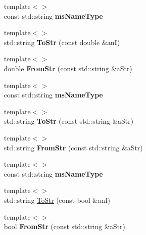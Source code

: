 \begin{DoxyCompactItemize}
\item 
{\footnotesize template$<$$>$ }\\const std\+::string {\bfseries ms\+Name\+Type}\hypertarget{classMMVII_1_1cStrIO_a4858ecf84461fb64cb3ed238611ec2ec}{}\label{classMMVII_1_1cStrIO_a4858ecf84461fb64cb3ed238611ec2ec}

\item 
{\footnotesize template$<$$>$ }\\std\+::string {\bfseries To\+Str} (const double \&anI)\hypertarget{classMMVII_1_1cStrIO_a6c24ca7c57073fe580fb1dbae47f0264}{}\label{classMMVII_1_1cStrIO_a6c24ca7c57073fe580fb1dbae47f0264}

\item 
{\footnotesize template$<$$>$ }\\double {\bfseries From\+Str} (const std\+::string \&a\+Str)\hypertarget{classMMVII_1_1cStrIO_ab50d8235935550074326ad3599f132a2}{}\label{classMMVII_1_1cStrIO_ab50d8235935550074326ad3599f132a2}

\item 
{\footnotesize template$<$$>$ }\\const std\+::string {\bfseries ms\+Name\+Type}\hypertarget{classMMVII_1_1cStrIO_afb687f6d989d13ae431bf97afbbe39e9}{}\label{classMMVII_1_1cStrIO_afb687f6d989d13ae431bf97afbbe39e9}

\item 
{\footnotesize template$<$$>$ }\\std\+::string {\bfseries To\+Str} (const std\+::string \&a\+Str)\hypertarget{classMMVII_1_1cStrIO_a90659cc9838948f7867c96bba2ea37d5}{}\label{classMMVII_1_1cStrIO_a90659cc9838948f7867c96bba2ea37d5}

\item 
{\footnotesize template$<$$>$ }\\std\+::string {\bfseries From\+Str} (const std\+::string \&a\+Str)\hypertarget{classMMVII_1_1cStrIO_a25dbf649bdc11b32cd71c9c4058f2209}{}\label{classMMVII_1_1cStrIO_a25dbf649bdc11b32cd71c9c4058f2209}

\item 
{\footnotesize template$<$$>$ }\\const std\+::string {\bfseries ms\+Name\+Type}\hypertarget{classMMVII_1_1cStrIO_ad16d7c4b4af20a33eb95daffe439566e}{}\label{classMMVII_1_1cStrIO_ad16d7c4b4af20a33eb95daffe439566e}

\item 
{\footnotesize template$<$$>$ }\\std\+::string \hyperlink{classMMVII_1_1cStrIO_a3461aaa745c3462405b0abe91ce1d55b}{To\+Str} (const bool \&anI)
\item 
{\footnotesize template$<$$>$ }\\bool {\bfseries From\+Str} (const std\+::string \&a\+Str)\hypertarget{classMMVII_1_1cStrIO_a80ed3fc6679e134d919eb443236d6686}{}\label{classMMVII_1_1cStrIO_a80ed3fc6679e134d919eb443236d6686}


\end{DoxyCompactItemize}

